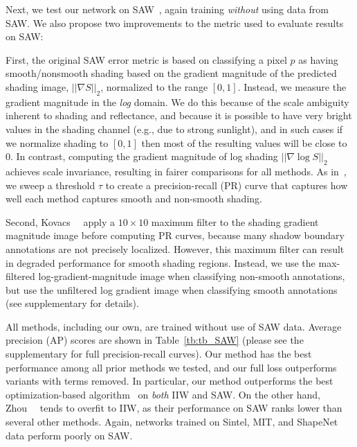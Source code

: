 \documentclass[10pt,twocolumn,letterpaper]{article}
\begin{document}
Next, we test our network on SAW~\cite{kovacs2017shading}, again training \emph{without} using
data from SAW. We also propose two improvements to the metric used to
evaluate results on SAW:

First, the original SAW error metric
is based on classifying a pixel $p$ as having smooth/nonsmooth shading
based on the gradient magnitude of the predicted shading image, $||
\nabla S ||_2$, normalized to the range $[0,1]$. Instead, we measure
the gradient magnitude in the {\em log} domain. We do this because of
the scale ambiguity inherent to shading and reflectance, and because
it is possible to have very bright values in the shading channel
(e.g., due to strong sunlight), and in such cases if we normalize
shading to $[0,1]$ then most of the resulting values will be close to
0. In contrast, computing the gradient magnitude of log shading $||
\nabla \log S ||_2$ achieves scale invariance, resulting in fairer
comparisons for all methods. As in~\cite{kovacs2017shading}, we sweep a
threshold $\tau$ to create a precision-recall (PR) curve that captures
how well each method captures smooth and non-smooth shading.

Second, Kovacs~\etal~ \cite{kovacs2017shading} apply a $10\times 10$
maximum filter to the shading gradient magnitude image before
computing PR curves, because many shadow boundary annotations are not
precisely localized.
However, this maximum filter can result in degraded performance for
smooth shading regions. 
Instead, we use the max-filtered log-gradient-magnitude image when
classifying non-smooth annotations, but use the unfiltered log
gradient image when classifying smooth annotations (see supplementary
for details).

All methods, including our own, are trained without use of SAW data.
Average precision (AP) scores  are shown in Table~\ref{tb:tb_SAW} (please see the supplementary for
full precision-recall curves).
Our method has the best performance among all prior methods we tested,
and our full loss outperforms variants with terms removed. In
particular, our method outperforms the best optimization-based
algorithm~\cite{bell2014intrinsic} on {\em both} IIW and SAW. On the
other hand, Zhou~\etal~\cite{zhou2015learning} tends to overfit to
IIW, as their performance on SAW ranks lower than several other
methods. Again, networks trained on Sintel, MIT, and ShapeNet data
perform poorly on SAW.
\end{document}
